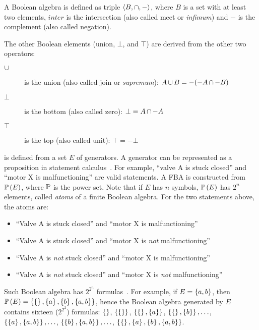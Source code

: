 \documentclass[en,twoside,onehalfspacing,phd]{risethesis}
\newcommand{\setsin}[1]{\ensuremath\left\{ #1 \right\}}
\newcommand{\anglesin}[1]{\ensuremath\left\langle #1 \right\rangle}
\def\union{\ensuremath\operatorname{\cup}}
\def\inter{\ensuremath\operatorname{\cap}}
\def\powersetop{\ensuremath\mathbb{P}}
\newcommand{\powerset}[1]{\ensuremath\powersetop\left(#1\right)}
\begin{document}
\begin{Def}
\label{def:boolean-algebra}
A Boolean algebra is defined as triple $\anglesin{B, \inter, -}$, where $B$ is a set with at least two elements, $inter$ is the intersection (also called meet or \emph{infimum}) and $-$ is the complement (also called negation).
\end{Def}
%
\noindent The other Boolean elements (union, $\bot$, and $\top$) are derived from the other two operators:
\begin{description}
  \item[$\union$] is the union (also called join or \emph{supremum}): $A \union B = -(-A \inter -B)$
  \item [$\bot$] is the bottom (also called zero): $\bot = A \inter -A$
  \item [$\top$] is the top (also called unit): $\top = -\bot$
\end{description}

\begin{sloppypar}
 is defined from a set $E$ of generators.
A generator can be represented as a proposition in statement calculus~\cite[p. 274]{Stoll1979}.
For example, ``valve A is stuck closed'' and ``motor X is malfunctioning'' are valid statements.
A \acl{FBA} is constructed from $\powerset{E}$, where $\powersetop$ is the power set.
Note that if $E$ has $n$ symbols, $\powerset{E}$ has $2^{n}$ elements, called \emph{atoms} of a finite Boolean algebra.
For the two statements above, the atoms are:
\begin{itemize}
  \item ``Valve A is stuck closed'' and ``motor X is malfunctioning''
  \item ``Valve A is stuck closed'' and ``motor X is \emph{not} malfunctioning''
  \item ``Valve A is \emph{not} stuck closed'' and ``motor X is malfunctioning''
  \item ``Valve A is \emph{not} stuck closed'' and ``motor X is \emph{not} malfunctioning''
\end{itemize}
Such Boolean algebra has $2^{2^{n}}$ formulas~\cite[p. 261]{GH2009}.
For example, if $E = \setsin{a,b}$, then $\powerset{E} = \setsin{ \setsin{}, \setsin{a}, \setsin{b}, \setsin{a,b} }$, hence the Boolean algebra generated by $E$ contains sixteen ($2^{2^{2}}$) formulas:
$\setsin{}$,
$\setsin{\setsin{}}$,
$\setsin{\setsin{}, \setsin{a}}$,
$\setsin{\setsin{}, \setsin{b}}, \ldots$,
$\setsin{\setsin{a}, \setsin{a,b}}, \ldots$,
$\setsin{\setsin{b}, \setsin{a,b}}, \ldots$,
$\setsin{\setsin{}, \setsin{a}, \setsin{b}, \setsin{a,b}}$.
\end{sloppypar}
\end{document}
